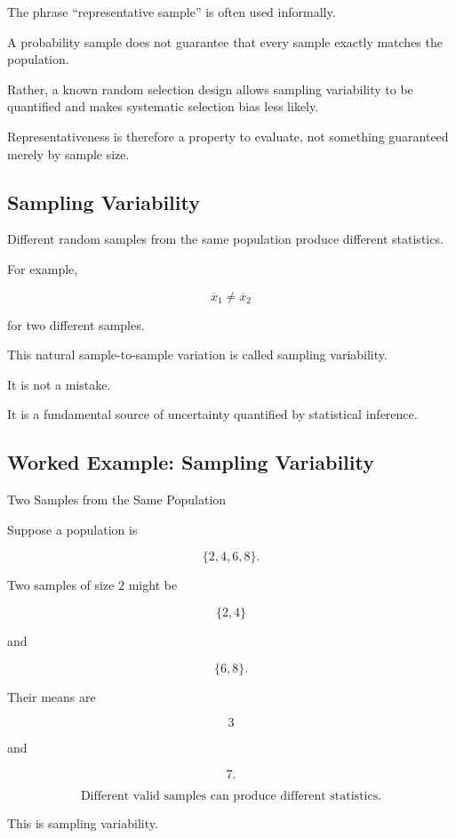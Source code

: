 The phrase ``representative sample'' is often used informally.

A probability sample does not guarantee that every sample exactly
matches the population.

Rather, a known random selection design allows sampling variability to
be quantified and makes systematic selection bias less likely.

Representativeness is therefore a property to evaluate, not something
guaranteed merely by sample size.

\subsection{Sampling Variability}
\label{subsec:sampling-variability}

Different random samples from the same population produce different
statistics.

For example,

\[
\overline{x}_1
\neq
\overline{x}_2
\]

for two different samples.

This natural sample-to-sample variation is called sampling variability.

It is not a mistake.

It is a fundamental source of uncertainty quantified by statistical
inference.

\subsection{Worked Example: Sampling Variability}
\label{subsec:worked-sampling-variability}

\begin{workedexamplebox}{Two Samples from the Same Population}

Suppose a population is

\[
\{2,4,6,8\}.
\]

Two samples of size \(2\) might be

\[
\{2,4\}
\]

and

\[
\{6,8\}.
\]

Their means are

\[
3
\]

and

\[
7.
\]

\begin{answerbox}
\[
\boxed{
\text{Different valid samples can produce different statistics.}
}
\]
\end{answerbox}

This is sampling variability.

\end{workedexamplebox}

